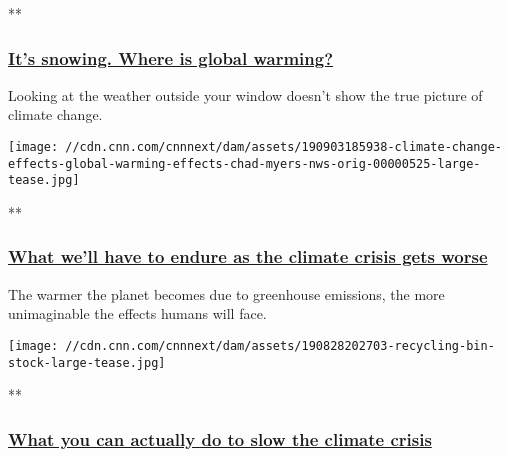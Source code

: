**

\hypertarget{its-snowing-where-is-global-warming}{%
\subsubsection{\texorpdfstring{\href{/videos/weather/2019/09/03/climate-change-global-warming-local-weather-myers-nws-orig.cnn}{It's
snowing. Where is global
warming?}}{It's snowing. Where is global warming?}}\label{its-snowing-where-is-global-warming}}

Looking at the weather outside your window doesn't show the true picture
of climate change.

\href{/videos/weather/2019/09/03/climate-change-effects-global-warming-effects-chad-myers-nws-orig.cnn}{}

\texttt{[image: //cdn.cnn.com/cnnnext/dam/assets/190903185938-climate-change-effects-global-warming-effects-chad-myers-nws-orig-00000525-large-tease.jpg]}

**

\hypertarget{what-well-have-to-endure-as-the-climate-crisis-gets-worse}{%
\subsubsection{\texorpdfstring{\href{/videos/weather/2019/09/03/climate-change-effects-global-warming-effects-chad-myers-nws-orig.cnn}{What
we'll have to endure as the climate crisis gets
worse}}{What we'll have to endure as the climate crisis gets worse}}\label{what-well-have-to-endure-as-the-climate-crisis-gets-worse}}

The warmer the planet becomes due to greenhouse emissions, the more
unimaginable the effects humans will face.

\href{/videos/weather/2019/09/03/climate-change-global-warming-what-can-i-do-chad-myers-nws-orig.cnn}{}

\texttt{[image: //cdn.cnn.com/cnnnext/dam/assets/190828202703-recycling-bin-stock-large-tease.jpg]}

**

\hypertarget{what-you-can-actually-do-to-slow-the-climate-crisis}{%
\subsubsection{\texorpdfstring{\href{/videos/weather/2019/09/03/climate-change-global-warming-what-can-i-do-chad-myers-nws-orig.cnn}{What
you can actually do to slow the climate
crisis}}{What you can actually do to slow the climate crisis}}\label{what-you-can-actually-do-to-slow-the-climate-crisis}}

